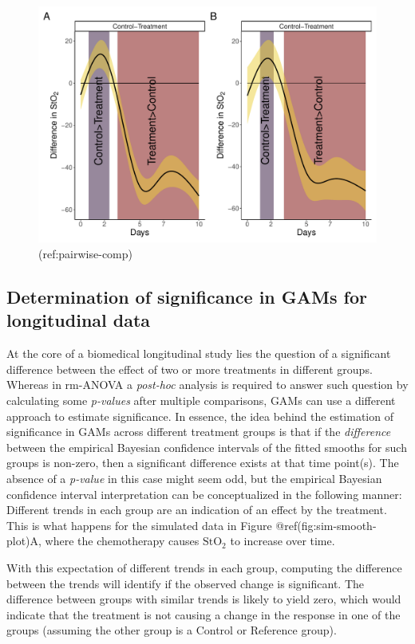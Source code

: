 \documentclass[Royal,times,sagev]{sagej}
\begin{document}
\begin{figure}

{\centering \includegraphics[width=0.75\linewidth]{Full_document_SAGE_files/figure-latex/plot-pairwise-comp-1} 

}

\caption{(ref:pairwise-comp)}\label{fig:plot-pairwise-comp}
\end{figure}

\hypertarget{GAM-significance}{%
\subsection{Determination of significance in GAMs for longitudinal
data}\label{GAM-significance}}

At the core of a biomedical longitudinal study lies the question of a
significant difference between the effect of two or more treatments in
different groups. Whereas in rm-ANOVA a \emph{post-hoc} analysis is
required to answer such question by calculating some \emph{p-values}
after multiple comparisons, GAMs can use a different approach to
estimate significance. In essence, the idea behind the estimation of
significance in GAMs across different treatment groups is that if the
\emph{difference} between the empirical Bayesian confidence intervals of
the fitted smooths for such groups is non-zero, then a significant
difference exists at that time point(s). The absence of a \emph{p-value}
in this case might seem odd, but the empirical Bayesian confidence
interval interpretation can be conceptualized in the following manner:
Different trends in each group are an indication of an effect by the
treatment. This is what happens for the simulated data in Figure
@ref(fig:sim-smooth-plot)A, where the chemotherapy causes
\(\mbox{StO}_2\) to increase over time.

With this expectation of different trends in each group, computing the
difference between the trends will identify if the observed change is
significant. The difference between groups with similar trends is likely
to yield zero, which would indicate that the treatment is not causing a
change in the response in one of the groups (assuming the other group is
a Control or Reference group).
\end{document}
